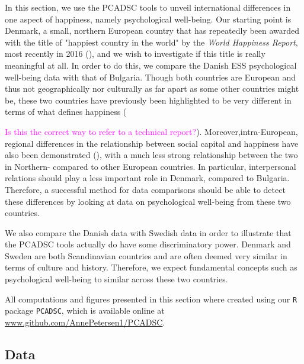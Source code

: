 \documentclass[titlepage,11pt,twoside]{article}
\newcommand{\hl}[1]{\textcolor{magenta}{#1}}
\newcommand{\R}[1]{\texttt{#1}}
\begin{document}
In this section, we use the PCADSC tools to unveil international differences in one aspect of happiness, namely psychological well-being. Our starting point is Denmark, a small, northern European country that has repeatedly been awarded with the title of "happiest country in the world"  by the \textit{World Happiness Report}, most recently in 2016 (\cite{WHR2016}), and we wish to investigate if this title is really meaningful at all. In order to do this, we compare the Danish ESS psychological well-being data with that of Bulgaria. Though both countries are European and thus not geographically nor culturally as far apart as some other countries might be, these two countries have previously been highlighted to be very different in terms of what defines happiness (\cite{ESStopline5} {\hl{Is this the correct way to refer to a technical report?}). Moreover,intra-European, regional differences in the relationship between social capital and happiness have also been demonstrated (\cite{Rodriguez2014}), with a much less strong relationship between the two in Northern- compared to other European countries. In particular, interpersonal relations should play a less important role in Denmark, compared to Bulgaria. Therefore, a successful method for data comparisons should be able to detect these differences by looking at data on psychological well-being from these two countries.

We also compare the Danish data with Swedish data in order to illustrate that the PCADSC tools actually do have some discriminatory power. Denmark and Sweden are both Scandinavian countries and are often deemed very similar in terms of culture and history. Therefore, we expect fundamental concepts such as psychological well-being to similar across these two countries.

All computations and figures presented in this section where created using our \R{R} package \R{PCADSC}, which is available online at \url{www.github.com/AnnePetersen1/PCADSC}.

\subsection{Data}

}
\end{document}
